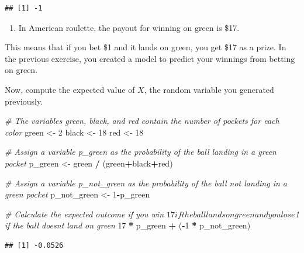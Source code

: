 \documentclass[
]{article}
\newenvironment{Shaded}{\begin{snugshade}}{\end{snugshade}}
\newcommand{\CommentTok}[1]{\textcolor[rgb]{0.56,0.35,0.01}{\textit{#1}}}
\newcommand{\DecValTok}[1]{\textcolor[rgb]{0.00,0.00,0.81}{#1}}
\newcommand{\NormalTok}[1]{#1}
\newcommand{\OperatorTok}[1]{\textcolor[rgb]{0.81,0.36,0.00}{\textbf{#1}}}
\newcommand{\StringTok}[1]{\textcolor[rgb]{0.31,0.60,0.02}{#1}}
\providecommand{\tightlist}{%
  \setlength{\itemsep}{0pt}\setlength{\parskip}{0pt}}
\begin{document}
\begin{verbatim}
## [1] -1
\end{verbatim}

\begin{enumerate}
\def\labelenumi{\arabic{enumi}.}
\setcounter{enumi}{2}
\tightlist
\item
  In American roulette, the payout for winning on green is \$17.
\end{enumerate}

This means that if you bet \$1 and it lands on green, you get \$17 as a
prize. In the previous exercise, you created a model to predict your
winnings from betting on green.

Now, compute the expected value of \(X\), the random variable you
generated previously.

\begin{Shaded}
\begin{Highlighting}[]
\CommentTok{\# The variables \textquotesingle{}green\textquotesingle{}, \textquotesingle{}black\textquotesingle{}, and \textquotesingle{}red\textquotesingle{} contain the number of pockets for each color}
\NormalTok{green \textless{}{-}}\StringTok{ }\DecValTok{2}
\NormalTok{black \textless{}{-}}\StringTok{ }\DecValTok{18}
\NormalTok{red \textless{}{-}}\StringTok{ }\DecValTok{18}

\CommentTok{\# Assign a variable \textasciigrave{}p\_green\textasciigrave{} as the probability of the ball landing in a green pocket}
\NormalTok{p\_green \textless{}{-}}\StringTok{ }\NormalTok{green }\OperatorTok{/}\StringTok{ }\NormalTok{(green}\OperatorTok{+}\NormalTok{black}\OperatorTok{+}\NormalTok{red)}

\CommentTok{\# Assign a variable \textasciigrave{}p\_not\_green\textasciigrave{} as the probability of the ball not landing in a green pocket}
\NormalTok{p\_not\_green \textless{}{-}}\StringTok{ }\DecValTok{1}\OperatorTok{{-}}\NormalTok{p\_green}

\CommentTok{\# Calculate the expected outcome if you win $17 if the ball lands on green and you lose $1 if the ball doesn\textquotesingle{}t land on green}
\DecValTok{17} \OperatorTok{*}\StringTok{ }\NormalTok{p\_green }\OperatorTok{+}\StringTok{ }\NormalTok{(}\OperatorTok{{-}}\DecValTok{1} \OperatorTok{*}\StringTok{ }\NormalTok{p\_not\_green)}
\end{Highlighting}
\end{Shaded}

\begin{verbatim}
## [1] -0.0526
\end{verbatim}
\end{document}

